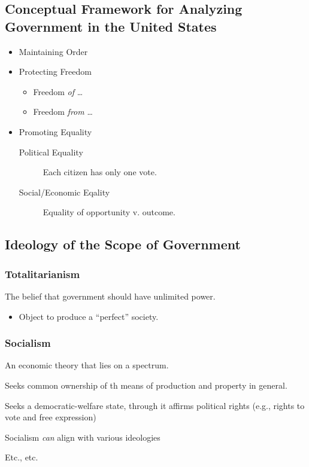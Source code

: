 \subsection{Conceptual Framework for Analyzing Government in the United States}
\begin{itemize}
    \item Maintaining Order
    \item Protecting Freedom
    \begin{itemize}
        \item Freedom \textit{of} \ldots
        \item Freedom \textit{from} \ldots
    \end{itemize}
    \item Promoting Equality
    \begin{description}
        \item[Political Equality] Each citizen has only one vote.
        \item[Social/Economic Eqality] Equality of opportunity v. outcome.
    \end{description}
\end{itemize}
\subsection{Ideology of the Scope of Government}
\subsubsection{Totalitarianism}
The belief that government should have unlimited power.
\begin{itemize}
    \item Object to produce a ``perfect'' society.
\end{itemize}
\subsubsection{Socialism}
An economic theory that lies on a spectrum.
\begin{description}
    \item[Communism] Seeks common ownership of th means of production and property in general.
    \item[Democratic-Socialism] Seeks a democratic-welfare state, through it affirms political rights (e.g., rights to vote and free expression)
    \item[Christian Socialism] Socialism \textit{can} align with various ideologies
    \item Etc., etc.
\end{description}

